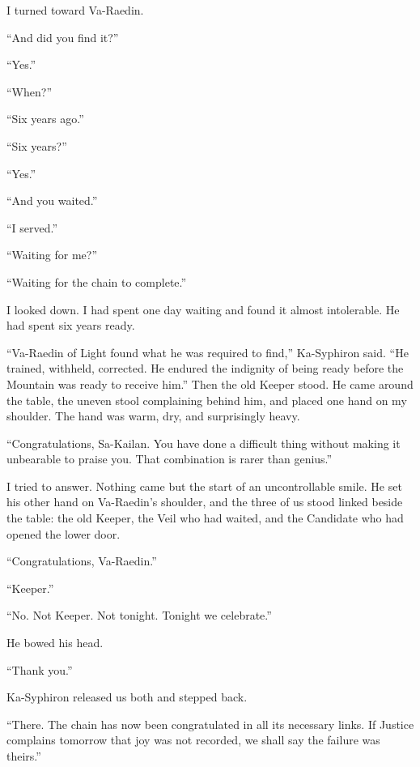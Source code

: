 I turned toward Va-Raedin.\par
``And did you find it?''\par
``Yes.''\par
``When?''\par
``Six years ago.''\par
``Six years?''\par
``Yes.''\par
``And you waited.''\par
``I served.''\par
``Waiting for me?''\par
``Waiting for the chain to complete.''\par

I looked down. I had spent one day waiting and found it almost intolerable. He had spent six years ready.\par

``Va-Raedin of Light found what he was required to find,'' Ka-Syphiron said. ``He trained, withheld, corrected. He endured the indignity of being ready before the Mountain was ready to receive him.'' Then the old Keeper stood. He came around the table, the uneven stool complaining behind him, and placed one hand on my shoulder. The hand was warm, dry, and surprisingly heavy.\par

``Congratulations, Sa-Kailan. You have done a difficult thing without making it unbearable to praise you. That combination is rarer than genius.''\par

I tried to answer. Nothing came but the start of an uncontrollable smile. He set his other hand on Va-Raedin's shoulder, and the three of us stood linked beside the table: the old Keeper, the Veil who had waited, and the Candidate who had opened the lower door.\par

``Congratulations, Va-Raedin.''\par
``Keeper.''\par
``No. Not Keeper. Not tonight. Tonight we celebrate.'' \par
He bowed his head.\par
``Thank you.''\par

Ka-Syphiron released us both and stepped back.\par

``There. The chain has now been congratulated in all its necessary links. If Justice complains tomorrow that joy was not recorded, we shall say the failure was theirs.''\par

